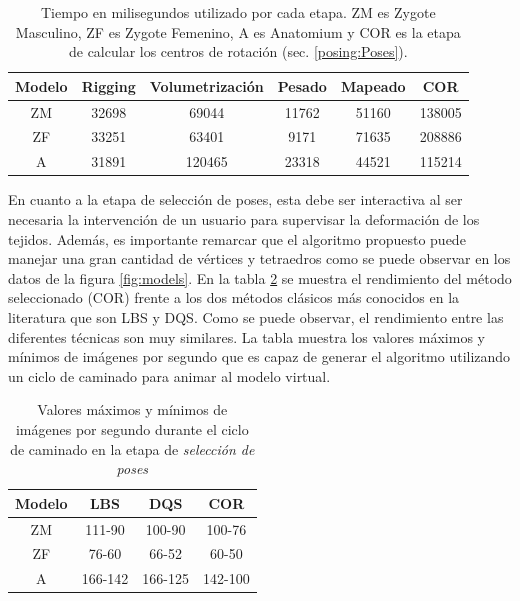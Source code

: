 \begin{table}[!h]
\centering
\caption{Tiempo en milisegundos utilizado por cada etapa. ZM es Zygote Masculino, ZF es Zygote Femenino, A es Anatomium y \ac{COR} es la etapa de calcular los centros de rotación (sec. \ref{posing:Poses}).}
\begin{tabular}{|c|c|c|c|c|c|}
\hline
\textbf{Modelo} & \textbf{Rigging} & \textbf{Volumetrización} & \textbf{Pesado} & \textbf{Mapeado} & \textbf{COR }  \\ 
\hline
ZM  & 32698 & 69044 & 11762  & 51160   & 138005 \\ 
\hline
ZF  & 33251 & 63401 & 9171  & 71635   & 208886  \\ 
\hline
A   & 31891 & 120465 & 23318 & 44521  & 115214\\ 
\hline
\end{tabular}
\label{tab:pre_pro}
\end{table}


En cuanto a la etapa de selección de poses, esta debe ser interactiva al ser necesaria la intervención de un usuario para supervisar la deformación de los tejidos. Además, es importante remarcar que el algoritmo propuesto puede manejar una gran cantidad de vértices y tetraedros como se puede observar en los datos de la figura \ref{fig:models}. En la tabla \ref{tab:inter} se muestra el rendimiento del método seleccionado (\ac{COR}) frente a los dos métodos clásicos más conocidos en la literatura que son \ac{LBS} y \ac{DQS}. Como se puede observar, el rendimiento entre las diferentes técnicas son muy similares. La tabla muestra los valores máximos y mínimos de imágenes por segundo que es capaz de generar el algoritmo utilizando un ciclo de caminado para animar al modelo virtual.
%
\begin{table}[h]
\centering
\caption{Valores máximos y mínimos de imágenes por segundo durante el ciclo de caminado en la etapa de \emph{selección de poses} }
\begin{tabular}{|c|c|c|c|}
\hline
\textbf{Modelo}&\textbf{LBS} &\textbf{DQS} &\textbf{COR} \\ 
\hline
ZM  & 111-90 & 100-90 & 100-76\\ 
\hline
ZF  & 76-60  & 66-52   & 60-50 \\ 
\hline
A   & 166-142 & 166-125 & 142-100\\ 
\hline
\end{tabular}
\label{tab:inter}
\end{table}




